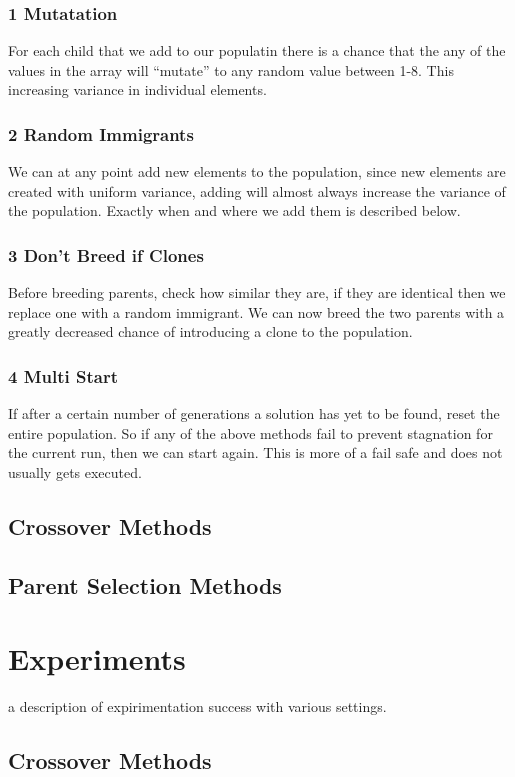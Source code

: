 \documentclass[a4paper,11pt]{article}
\begin{document}
\subsubsection*{1 Mutatation}
For each child that we add to our populatin there is a chance that the any of the values in the array will ``mutate'' to any random value between 1-8. This increasing variance in individual elements.
\subsubsection*{2 Random Immigrants}
We can at any point add new elements to the population, since new elements are created with uniform variance, adding will almost always increase the variance of the population.
Exactly when and where we add them is described below.
\subsubsection*{3 Don't Breed if Clones}
Before breeding parents, check how similar they are, if they are identical then we replace one with a random immigrant. We can now breed the two parents with a greatly decreased chance of introducing a clone to the population.
\subsubsection*{4 Multi Start}
If after a certain number of generations a solution has yet to be found, reset the entire population. So if any of the above methods fail to prevent stagnation for the current run, then we can start again. This is more of a fail safe and does not usually gets executed.

\subsection*{Crossover Methods}
\subsection*{Parent Selection Methods}

\section*{Experiments}
a description of expirimentation success with various settings.
\subsection*{Crossover Methods}
\end{document}

